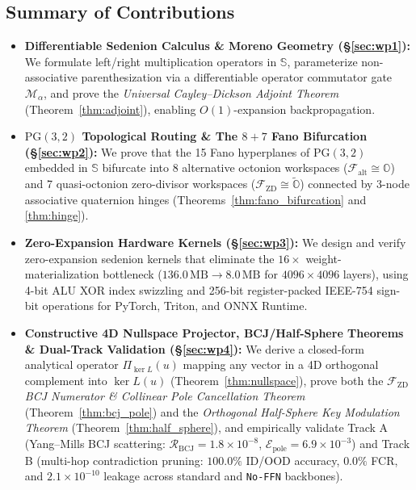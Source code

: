 \documentclass[11pt,a4paper]{article}
\theoremstyle{definition}
\theoremstyle{remark}
\newcommand{\Oc}{\mathbb{O}}
\newcommand{\Se}{\mathbb{S}}
\newcommand{\PG}{\mathrm{PG}}
\newcommand{\Falt}{\mathcal{F}_{\mathrm{alt}}}
\newcommand{\Fzd}{\mathcal{F}_{\mathrm{ZD}}}
\newcommand{\PiNull}{\Pi_{\ker L}}
\begin{document}
\subsection*{Summary of Contributions}
\begin{itemize}
    \item \textbf{Differentiable Sedenion Calculus \& Moreno Geometry (\S\ref{sec:wp1}):} We formulate left/right multiplication operators in $\Se$, parameterize non-associative parenthesization via a differentiable operator commutator gate $\mathcal{M}_\alpha$, and prove the \textit{Universal Cayley--Dickson Adjoint Theorem} (Theorem~\ref{thm:adjoint}), enabling $O(1)$-expansion backpropagation.
    \item \textbf{$\PG(3,2)$ Topological Routing \& The $8+7$ Fano Bifurcation (\S\ref{sec:wp2}):} We prove that the 15 Fano hyperplanes of $\PG(3,2)$ embedded in $\Se$ bifurcate into 8 alternative octonion workspaces ($\Falt \cong \Oc$) and 7 quasi-octonion zero-divisor workspaces ($\Fzd \cong \tilde{\Oc}$) connected by 3-node associative quaternion hinges (Theorems~\ref{thm:fano_bifurcation} and \ref{thm:hinge}).
    \item \textbf{Zero-Expansion Hardware Kernels (\S\ref{sec:wp3}):} We design and verify zero-expansion sedenion kernels that eliminate the $16\times$ weight-materialization bottleneck ($136.0\,\mathrm{MB} \to 8.0\,\mathrm{MB}$ for $4096 \times 4096$ layers), using 4-bit ALU XOR index swizzling and 256-bit register-packed IEEE-754 sign-bit operations for PyTorch, Triton, and ONNX Runtime.
    \item \textbf{Constructive 4D Nullspace Projector, BCJ/Half-Sphere Theorems \& Dual-Track Validation (\S\ref{sec:wp4}):} We derive a closed-form analytical operator $\PiNull(u)$ mapping any vector in a 4D orthogonal complement into $\ker L(u)$ (Theorem~\ref{thm:nullspace}), prove both the \textit{$\Fzd$ BCJ Numerator \& Collinear Pole Cancellation Theorem} (Theorem~\ref{thm:bcj_pole}) and the \textit{Orthogonal Half-Sphere Key Modulation Theorem} (Theorem~\ref{thm:half_sphere}), and empirically validate Track A (Yang--Mills BCJ scattering: $\mathcal{R}_{\mathrm{BCJ}} = 1.8 \times 10^{-8}$, $\mathcal{E}_{\mathrm{pole}} = 6.9 \times 10^{-3}$) and Track B (multi-hop contradiction pruning: $100.0\%$ ID/OOD accuracy, $0.0\%$ FCR, and $2.1 \times 10^{-10}$ leakage across standard and \texttt{No-FFN} \cite{Ji2026CliffordNet} backbones).
\end{itemize}

\end{document}
